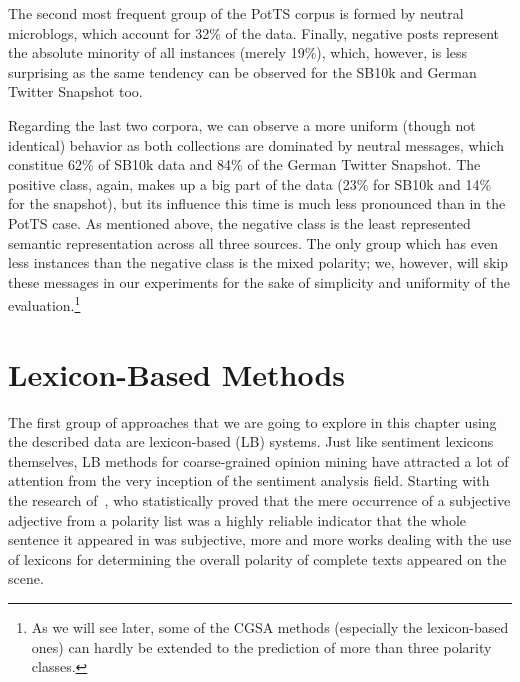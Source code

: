 The second most frequent group of the PotTS corpus is formed by
neutral microblogs, which account for 32\% of the data.  Finally,
negative posts represent the absolute minority of all instances
(merely 19\%), which, however, is less surprising as the same tendency
can be observed for the SB10k and German Twitter Snapshot too.

Regarding the last two corpora, we can observe a more uniform (though
not identical) behavior as both collections are dominated by neutral
messages, which constitue 62\% of SB10k data and 84\% of the German
Twitter Snapshot.  The positive class, again, makes up a big part of
the data (23\% for SB10k and 14\% for the snapshot), but its influence
this time is much less pronounced than in the PotTS case.  As
mentioned above, the negative class is the least represented semantic
representation across all three sources.  The only group which has
even less instances than the negative class is the mixed polarity; we,
however, will skip these messages in our experiments for the sake of
simplicity and uniformity of the evaluation.\footnote{As we will see
  later, some of the CGSA methods (especially the lexicon-based ones)
  can hardly be extended to the prediction of more than three polarity
  classes.}

\section{Lexicon-Based Methods}\label{sec:cgsa:lexicon-based}

The first group of approaches that we are going to explore in this
chapter using the described data are lexicon-based (LB) systems.  Just
like sentiment lexicons themselves, LB methods for coarse-grained
opinion mining have attracted a lot of attention from the very
inception of the sentiment analysis field.  Starting with the research
of~\citet{Hatzivassi:00}, who statistically proved that the mere
occurrence of a subjective adjective from a polarity list was a highly
reliable indicator that the whole sentence it appeared in was
subjective, more and more works dealing with the use of lexicons for
determining the overall polarity of complete texts appeared on the
scene.

